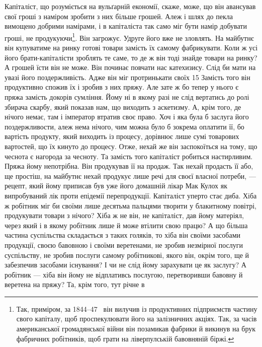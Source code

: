 Капіталіст, що розуміється на вульґарній економії, скаже,
може, що він авансував свої гроші з наміром зробити з них більше
грошей. Алеж і шлях до пекла вимощено добрими намірами, і в
капіталіста так само міг бути намір добувати гроші, не продукуючи\footnote{
Так, приміром, за 1844--47~ він вилучив із продуктивних підприємств
частину свого капіталу, щоб проспекулювати його на залізничних
акціях. Так, за часів американської громадянської війни він позамикав
фабрики й викинув на брук фабричних робітників, щоб грати на ліверпулській
бавовняній біржі.
}. Він загрожує. Удруге його вже
не зловлять. На майбутнє
він купуватиме на ринку готові товари замість їх самому
фабрикувати. Коли ж усі його брати-капіталісти зроблять те
саме, то де ж він тоді знайде товари на ринку? А грошей їсти
він не може. Він починає повчати нас катехизису. Слід би мати
на увазі його поздержливість. Адже він міг протринькати своїх
15 Замість того він продуктивно спожив їх і зробив
з них пряжу. Але зате ж бо тепер у нього є пряжа замість докорів
сумління. Йому ні в якому разі не слід вертатись до ролі
збирача скарбу, який показав нам, що виходить з аскетизму.
А, крім того, де нічого немає, там і імператор втратив своє право.
Хоч і яка була б заслуга його поздержливости, алеж нема нічого,
чим можна було б зокрема оплатити її, бо вартість продукту,
який виходить із процесу, дорівнює лише сумі товарових вартостей,
що їх кинуто до процесу. Отже, нехай же він заспокоїться
на тому, що чеснота є нагорода за чесноту. Та замість того капіталіст
робиться настирливим. Пряжа йому непотрібна. Він продукував
її на продаж. Так нехай продасть її або, ще простіш, на
майбутнє нехай продукує лише речі для своєї власної потреби, —
рецепт, який йому приписав був уже його домашній лікар Мак
Кулох як випробуваний лік проти епідемії перепродукції. Капіталіст
уперто стає диба. Хіба ж робітник міг би своїми лише
десятьма пальцями творити у блакитному повітрі, продукувати
товари з нічого? Хіба ж не він, не капіталіст, дав йому матеріял,
через який і в якому робітник лише й може втілити свою працю?
А що більша частина суспільства складається з таких голяків,
то хіба він своїми засобами продукції, своєю бавовною і своїми
веретенами, не зробив незмірної послуги суспільству, не зробив
послуги самому робітникові, якого він, окрім того, ще й забезпечив
засобами існування? І чи не слід йому зарахувати це як заслугу?
А робітник — хіба він йому не відплативсь послугою, перетворивши
бавовну й веретена на пряжу? Та, крім того, тут річне в
